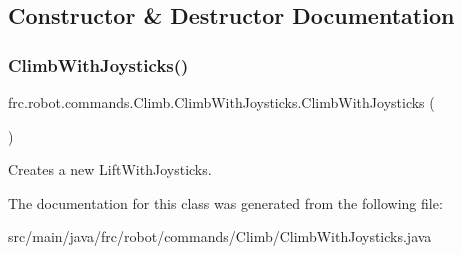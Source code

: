 \subsection{Constructor \& Destructor Documentation}
\mbox{\label{classfrc_1_1robot_1_1commands_1_1_climb_1_1_climb_with_joysticks_a99951d20cc4b0aa639c948a37860c562}} 
\subsubsection{\texorpdfstring{ClimbWithJoysticks()}{ClimbWithJoysticks()}}
{\footnotesize\ttfamily frc.\+robot.\+commands.\+Climb.\+Climb\+With\+Joysticks.\+Climb\+With\+Joysticks (\begin{DoxyParamCaption}{ }\end{DoxyParamCaption})\hspace{0.3cm}{\ttfamily [inline]}}

Creates a new Lift\+With\+Joysticks. 

The documentation for this class was generated from the following file\+:\begin{DoxyCompactItemize}
\item 
src/main/java/frc/robot/commands/\+Climb/Climb\+With\+Joysticks.\+java\end{DoxyCompactItemize}
